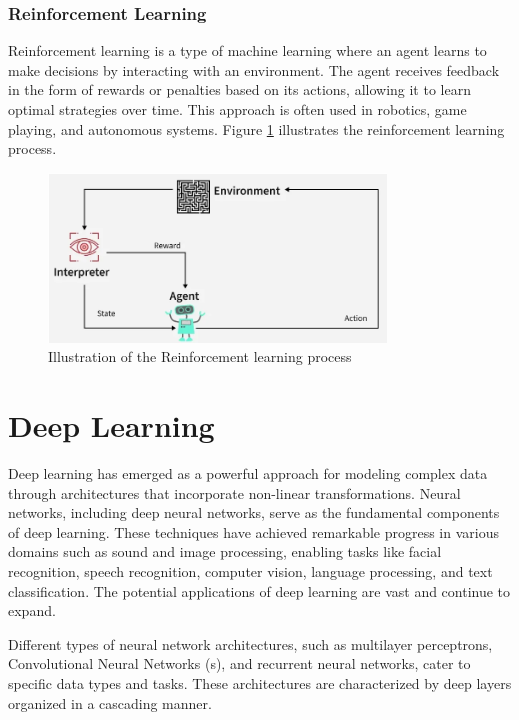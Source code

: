 \subsubsection{Reinforcement Learning}
Reinforcement learning is a type of machine learning where an agent learns to make decisions by interacting with an environment. The agent receives feedback in the form of rewards or penalties based on its actions, allowing it to learn optimal strategies over time. This approach is often used in robotics, game playing, and autonomous systems. Figure \ref{fig:reinforcement} illustrates the reinforcement learning process.
\begin{figure}[H]
  \centering
  \includegraphics[width=0.8\textwidth]{Images/Chapter1/reinforcement.png}
  \caption{Illustration of the Reinforcement learning process \cite{geeksforgeeks2025supervised} }
  \label{fig:reinforcement}
\end{figure}


\section{Deep Learning}
\label{sec:dl}
Deep learning has emerged as a powerful approach for modeling complex data through architectures that incorporate non-linear transformations. Neural networks, including deep neural networks, serve as the fundamental components of deep learning. These techniques have achieved remarkable progress in various domains such as sound and image processing, enabling tasks like facial recognition, speech recognition, computer vision, language processing, and text classification. The potential applications of deep learning are vast and continue to expand.

Different types of neural network architectures, such as multilayer perceptrons, Convolutional Neural Networks (s), and recurrent neural networks, cater to specific data types and tasks. These architectures are characterized by deep layers organized in a cascading manner.

